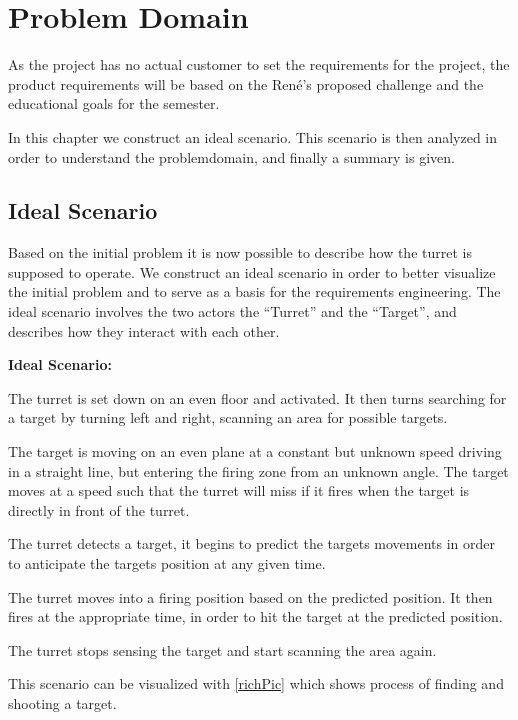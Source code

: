 \chapter{Problem Domain}
As the project has no actual customer to set the requirements for the project,
the product requirements will be based on the Ren\'e's proposed challenge and
the educational goals for the semester.\nl

In this chapter we construct an ideal scenario. This scenario is then analyzed in order to
understand the problemdomain, and finally a summary is given.

\section{Ideal Scenario}
Based on the initial problem it is now possible to describe how the turret is
supposed to operate. We construct an ideal scenario in order to better
visualize the initial problem and to serve as a basis for the requirements engineering.
The ideal scenario involves the two actors the ``Turret'' and the ``Target'',
 and
describes how they interact with each other.

\begin{center}
\colorbox{diff}{
\begin{minipage}{0.8\linewidth}
\textbf{Ideal Scenario:}

The turret is set down on an even floor and activated. It then turns searching
for a target by turning left and right, scanning an area for possible
targets.\nl

The target is moving on an even plane at a constant but unknown speed driving
in a straight line, but entering the firing zone from an unknown angle. The
target moves at a speed such that the turret will miss if it fires when the
target is directly in front of the turret.\nl

The turret detects a target, it begins to predict the targets movements in
order to anticipate the targets position at any given time.\nl

The turret moves into a firing position based on the predicted position. It then
fires at the appropriate time, in order to hit the target at the predicted
position.\nl

The turret stops sensing the target and start scanning the area again.
\end{minipage}
}
\end{center}

This scenario can be visualized with \autoref{richPic} which shows process of
finding and shooting a target.

